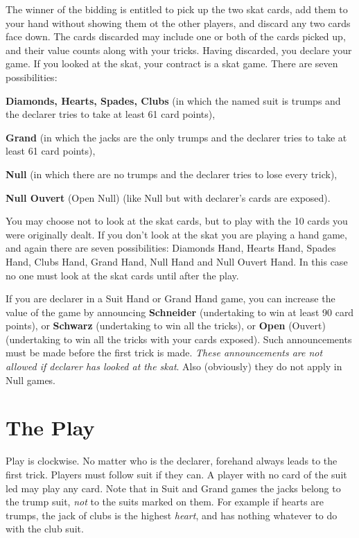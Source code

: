\documentclass[letter]{article}
\begin{document}
  The winner of the bidding is entitled to pick up the two skat cards, add them
  to your hand without showing them ot the other players, and discard any two
  cards face down. The cards discarded may include one or both of the cards
  picked up, and their value counts along with your tricks. Having discarded,
  you declare your game. If you looked at the skat, your contract is a skat
  game. There are seven possibilities:

  {\bfseries Diamonds, Hearts, Spades, Clubs} (in which the named suit is trumps and the
   declarer tries to take at least 61 card points),

  {\bfseries Grand} (in which the jacks are the only trumps and the declarer tries to take
   at least 61 card points),

  {\bfseries Null} (in which there are no trumps and the declarer tries to lose every
   trick),

  {\bfseries Null Ouvert} (Open Null) (like Null but with declarer's cards are exposed).

  You may choose not to look at the skat cards, but to play with the 10 cards
  you were originally dealt. If you don't look at the skat you are playing a
  hand game, and again there are seven possibilities: Diamonds Hand, Hearts
  Hand, Spades Hand, Clubs Hand, Grand Hand, Null Hand and Null Ouvert Hand.
  In this case no one must look at the skat cards until after the play.

  If you are declarer in a Suit Hand or Grand Hand game, you can increase the
  value of the game by announcing {\bfseries Schneider} (undertaking to win at
  least 90 card points), or {\bfseries Schwarz} (undertaking to win all the
  tricks), or {\bfseries Open} (Ouvert) (undertaking to win all the tricks with
  your cards exposed). Such announcements must be made before the first trick is
  made. \emph{These announcements are not allowed if declarer has looked at the
  skat}. Also (obviously) they do not apply in Null games.

  \section*{The Play}

  Play is clockwise. No matter who is the declarer, forehand always leads to the
  first trick. Players must follow suit if they can. A player with no card of
  the suit led may play any card. Note that in Suit and Grand games the jacks
  belong to the trump suit, \emph{not} to the suits marked on them. For example
  if hearts are trumps, the jack of clubs is the highest \emph{heart}, and has
  nothing whatever to do with the club suit.
\end{document}
